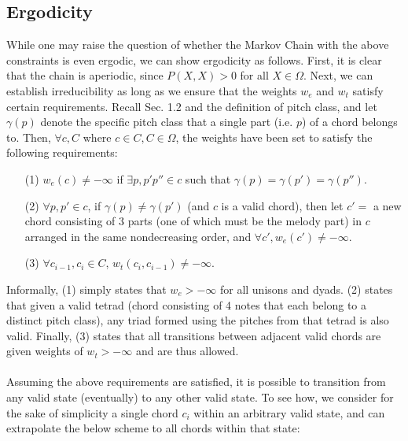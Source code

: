 \documentclass[twoside]{article}
\begin{document}
	\subsection{Ergodicity}
	While one may raise the question of whether the Markov Chain with the above constraints is even ergodic, we can show ergodicity as follows. First, it is clear that the chain is aperiodic, since $P(X, X) > 0$ for all $X \in \Omega$.	Next, we can establish irreducibility as long as we ensure that the weights $w_e$ and $w_t$ satisfy certain requirements. Recall Sec. 1.2 and the definition of pitch class, and let $\gamma(p)$ denote the specific pitch class that a single part (i.e. $p$) of a chord belongs to. Then, $\forall c,C$ where $c \in C, C \in \Omega$, the weights have been set to satisfy the following requirements:
	\begin{enumerate}
		\item [(1)]
		 $w_e(c) \neq -\infty$ if $\exists p, p' p'' \in c$ such that $\gamma(p) = \gamma(p') = \gamma(p'')$.
		\item [(2)]
		$\forall p, p' \in c$, if $\gamma(p) \neq \gamma(p')$ (and $c$ is a valid chord), then let $c' = $ a new chord consisting of 3 parts (one of which must be the melody part) in $c$ arranged in the same nondecreasing order, and $\forall c', w_e(c') \neq -\infty$.
		\item[(3)]
		$\forall c_{i-1},c_i \in C$, $w_t(c_i, c_{i-1}) \neq -\infty$.
	\end{enumerate}
	Informally, (1) simply states that $w_e > -\infty$ for all unisons and dyads. (2) states that given a valid tetrad (chord consisting of 4 notes that each belong to a distinct pitch class), any triad formed using the pitches from that tetrad is also valid. Finally, (3) states that all transitions between adjacent valid chords are given weights of $w_t > -\infty$ and are thus allowed.
	\\\\
	Assuming the above requirements are satisfied, it is possible to transition from any valid state (eventually) to any other valid state. To see how, we consider for the sake of simplicity a single chord $c_i$ within an arbitrary valid state, and can extrapolate the below scheme to all chords within that state:
\end{document}
